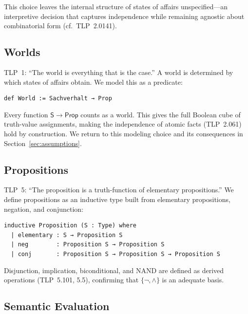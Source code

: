 \documentclass[10pt, letterpaper]{article}
\theoremstyle{definition}
\theoremstyle{remark}
\newcommand{\Sach}{\mathsf{S}}
\newcommand{\Prop}{\mathsf{Prop}}
\begin{document}
\noindent
This choice leaves the internal structure of states of affairs
unspecified---an interpretive decision that captures independence
while remaining agnostic about combinatorial form (cf.\
TLP~2.0141).

\subsection{Worlds}
\label{sec:worlds}

TLP~1: ``The world is everything that is the case.''
A world is determined by which states of affairs obtain.  We
model this as a predicate:

\begin{lstlisting}
def World := Sachverhalt → Prop
\end{lstlisting}

\noindent
Every function $\Sach \to \Prop$ counts as a world.  This gives
the full Boolean cube of truth-value assignments, making the
independence of atomic facts (TLP~2.061) hold by construction.
We return to this modeling choice and its consequences in
Section~\ref{sec:assumptions}.

\subsection{Propositions}
\label{sec:propositions}

TLP~5: ``The proposition is a truth-function of elementary
propositions.''  We define propositions as an inductive type
built from elementary propositions, negation, and conjunction:

\begin{lstlisting}
inductive Proposition (S : Type) where
  | elementary : S → Proposition S
  | neg        : Proposition S → Proposition S
  | conj       : Proposition S → Proposition S → Proposition S
\end{lstlisting}

\noindent
Disjunction, implication, biconditional, and NAND are defined as
derived operations (TLP~5.101, 5.5), confirming that $\{\lnot, \land\}$
is an adequate basis.

\subsection{Semantic Evaluation}
\label{sec:eval}
\end{document}
